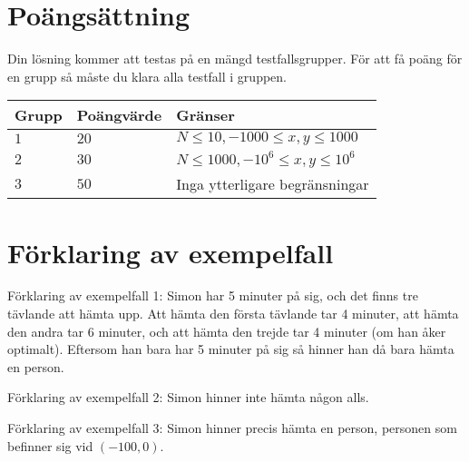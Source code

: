 \section*{Poängsättning}
Din lösning kommer att testas på en mängd testfallsgrupper.
För att få poäng för en grupp så måste du klara alla testfall i gruppen.

\noindent
\begin{tabular}{| l | l | l |}
  \hline
  Grupp & Poängvärde & Gränser \\ \hline
  $1$   & $20$       & $N \leq 10, -1000 \leq x,y \leq 1000$ \\ \hline
  $2$   & $30$       & $N \leq 1000, -10^6 \leq x,y \leq 10^6$ \\ \hline
  $3$   & $50$       & Inga ytterligare begränsningar \\ \hline
\end{tabular}

\section*{Förklaring av exempelfall}
Förklaring av exempelfall 1: Simon har 5 minuter på sig, och det finns tre tävlande att hämta upp. Att hämta den första tävlande tar 4 minuter, att hämta den andra tar 6 minuter, och att hämta den trejde tar 4 minuter (om han åker optimalt). Eftersom han bara har 5 minuter på sig så hinner han då bara hämta en person.

Förklaring av exempelfall 2: Simon hinner inte hämta någon alls.

Förklaring av exempelfall 3: Simon hinner precis hämta en person, personen som befinner sig vid $(-100, 0)$.